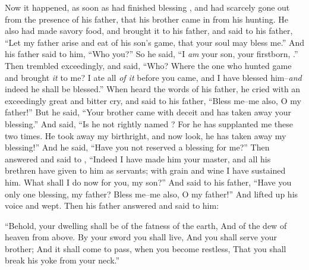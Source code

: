 
\bverse Now it happened, as soon as \Isaac had finished blessing \Jacob, and \Jacob had scarcely gone out from the presence of \Isaac his father, that \Esau his brother came in from his hunting.
\bverse He also had made savory food, and brought it to his father, and said to his father, ``Let my father arise and eat of his son's game, that your soul may bless me.''
\bverse And his father \Isaac said to him, ``Who \are you?'' So he said, ``I \textit{am} your son, your firstborn, \Esau.''
\bverse Then \Isaac trembled exceedingly, and said, ``Who? Where \is the one who hunted game and brought \textit{it} to me? I ate all \textit{of it} before you came, and I have blessed him--\textit{and} indeed he shall be blessed.''
\bverse When \Esau heard the words of his father, he cried with an exceedingly great and bitter cry, and said to his father, ``Bless me--me also, O my father!''
\bverse But he said, ``Your brother came with deceit and has taken away your blessing.''
\bverse And \textit{\Esau} said, ``Is he not rightly named \Jacob? For he has supplanted me these two times. He took away my birthright, and now look, he has taken away my blessing!'' And he said, ``Have you not reserved a blessing for me?''
\bverse Then \Isaac answered and said to \Esau, ``Indeed I have made him your master, and all his brethren have given to him as servants; with grain and wine I have sustained him. What shall I do now for you, my son?''
\bverse And \Esau said to his father, ``Have you only one blessing, my father? Bless me--me also, O my father!'' And \Esau lifted up his voice and wept.
\bverse Then \Isaac his father answered and said to him:
\begin{bquotation}
``Behold, your dwelling shall be of the fatness of the earth, And of the dew of heaven from above. \bverse By your sword you shall live, And you shall serve your brother; And it shall come to pass, when you become restless, That you shall break his yoke from your neck.''
\end{bquotation}


